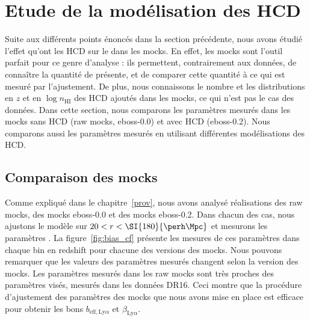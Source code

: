 \section{Etude de la modélisation des HCD}
\label{sec:etude_model_hcd}
Suite aux différents points énoncés dans la section précédente, nous avons étudié l'effet qu'ont les HCD sur le \lya{} dans les mocks.
En effet, les mocks sont l'outil parfait pour ce genre d'analyse : ils permettent, contrairement aux données, de connaître la quantité de \lya{} présente, et de comparer cette quantité à ce qui est mesuré par l'ajustement. De plus, nous connaissons le nombre et les distributions en $z$ et en $\log n_{\mathrm{HI}}$ des HCD ajoutés dans les mocks, ce qui n'est pas le cas des données.
Dans cette section, nous comparons les paramètres \lya{} mesurés dans les mocks sans HCD (raw mocks, eboss-0.0) et avec HCD (eboss-0.2). Nous comparons aussi les paramètres \lya{} mesurés en utilisant différentes modélisations des HCD.

\subsection{Comparaison des mocks}
\label{subsec:comparaison_mocks}
Comme expliqué dans le chapitre~\ref{prov}, nous avons analysé \Nmocks{} réalisations des raw mocks, des mocks eboss-0.0 et des mocks eboss-0.2.
Dans chacun des cas, nous ajustons le modèle sur $20 < r < \SI{180}{\perh\Mpc}$ et mesurons les paramètres \lya{}.
La figure~\ref{fig:bias_cf} présente les mesures de ces paramètres dans chaque bin en redshift pour chacune des versions des mocks.
Nous pouvons remarquer que les valeurs des paramètres \lya{} mesurés changent selon la version des mocks.
Les paramètres mesurés dans les raw mocks sont très proches des paramètres visés, mesurés dans les données DR16. Ceci montre que la procédure d'ajustement des paramètres des mocks que nous avons mise en place est efficace pour obtenir les bons $b_{\mathrm{eff},\mathrm{Ly}\alpha}$ et $\beta_{\mathrm{Ly}\alpha}$.

